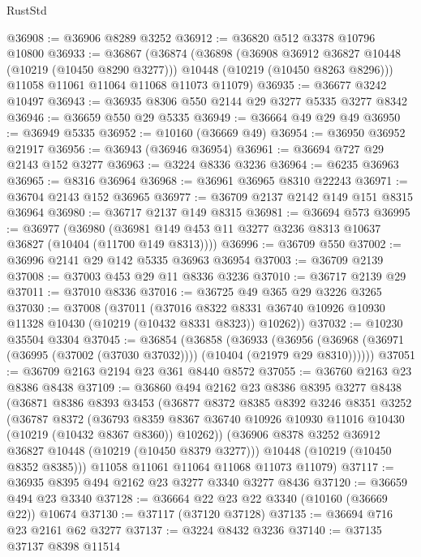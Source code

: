 \begin{lexlean}{RustStd}
\begin{coremodule}
@36908 := @36906 @8289 @3252
@36912 := @36820 @512 @3378 @10796 @10800
@36933 := @36867
    (@36874
      (@36898
        (@36908 @36912 @36827 @10448 (@10219 (@10450 @8290 @3277)))
        @10448
        (@10219 (@10450 @8263 @8296)))
      @11058
      @11061
      @11064
      @11068
      @11073
      @11079)
@36935 := @36677 @3242 @10497
@36943 := @36935 @8306 @550 @2144 @29 @3277 @5335 @3277 @8342
@36946 := @36659 @550 @29 @5335
@36949 := @36664 @49 @29 @49
@36950 := @36949 @5335
@36952 := @10160 (@36669 @49)
@36954 := @36950 @36952 @21917
@36956 := @36943 (@36946 @36954)
@36961 := @36694 @727 @29 @2143 @152 @3277
@36963 := @3224 @8336 @3236
@36964 := @6235 @36963
@36965 := @8316 @36964
@36968 := @36961 @36965 @8310 @22243
@36971 := @36704 @2143 @152 @36965
@36977 := @36709 @2137 @2142 @149 @151 @8315 @36964
@36980 := @36717 @2137 @149 @8315
@36981 := @36694 @573
@36995 := @36977
    (@36980 (@36981 @149 @453 @11 @3277 @3236 @8313 @10637 @36827 (@10404 (@11700 @149 @8313))))
@36996 := @36709 @550
@37002 := @36996 @2141 @29 @142 @5335 @36963 @36954
@37003 := @36709 @2139
@37008 := @37003 @453 @29 @11 @8336 @3236
@37010 := @36717 @2139 @29
@37011 := @37010 @8336
@37016 := @36725 @49 @365 @29 @3226 @3265
@37030 := @37008
    (@37011
      (@37016 @8322 @8331 @36740 @10926 @10930 @11328 @10430 (@10219 (@10432 @8331 @8323)) @10262))
@37032 := @10230 @35504 @3304
@37045 := @36854
    (@36858
      (@36933
        (@36956 (@36968 (@36971 (@36995 (@37002 (@37030 @37032)))) (@10404 (@21979 @29 @8310))))))
@37051 := @36709 @2163 @2194 @23 @361 @8440 @8572
@37055 := @36760 @2163 @23 @8386 @8438
@37109 := @36860
    @494
    @2162
    @23
    @8386
    @8395
    @3277
    @8438
    (@36871
      @8386
      @8393
      @3453
      (@36877
        @8372
        @8385
        @8392
        @3246
        @8351
        @3252
        (@36787
          @8372
          (@36793
            @8359
            @8367
            @36740
            @10926
            @10930
            @11016
            @10430
            (@10219 (@10432 @8367 @8360))
            @10262))
        (@36906 @8378 @3252 @36912 @36827 @10448 (@10219 (@10450 @8379 @3277)))
        @10448
        (@10219 (@10450 @8352 @8385)))
      @11058
      @11061
      @11064
      @11068
      @11073
      @11079)
@37117 := @36935 @8395 @494 @2162 @23 @3277 @3340 @3277 @8436
@37120 := @36659 @494 @23 @3340
@37128 := @36664 @22 @23 @22 @3340 (@10160 (@36669 @22)) @10674
@37130 := @37117 (@37120 @37128)
@37135 := @36694 @716 @23 @2161 @62 @3277
@37137 := @3224 @8432 @3236
@37140 := @37135 @37137 @8398 @11514

\end{coremodule}
\end{lexlean}
